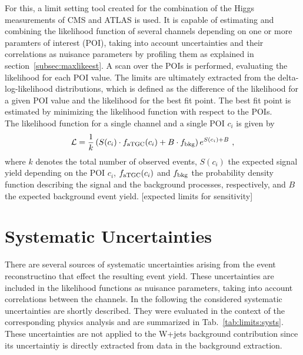 For this, a limit setting tool created for the combination of the Higgs measurements of CMS and ATLAS \cite{combine} is used. It is capable of estimating and combining the likelihood function of several channels depending on one or more paramters of interest (POI), taking into account uncertainties and their correlations as nuisance parameters  by profiling them as explained in section~\ref{subsec:maxlikeest}. A scan over the POIs is performed, evaluating the likelihood for each POI value.
The limits are ultimately extracted from the delta-log-likelihood distributions, which is defined as the difference of the likelihood for a given POI value and the likelihood for the best fit point. The best fit point is estimated by minimizing the likelihood function with respect to the POIs.\\

\noindent The likelihood function for a single channel and a single POI $c_i$ is given by
\begin{equation}
\mathcal{L} = \frac{1}{k} \left( S(c_i)\cdot f_{\rm aTGC}(c_i) + B \cdot f_{\rm bkg} \right) e^{S(c_i) + B} ~,
\end{equation}
where $k$ denotes the total number of observed events, $S(c_i)$ the expected signal yield depending on the POI $c_i$, $f_{\rm aTGC}(c_i)$ and $f_{\rm bkg}$ the probability density function describing the signal and the background processes, respectively, and $B$ the expected background event yield.
[expected limits for sensitivity]

\section{Systematic Uncertainties}
\label{sec:systematics}
There are several sources of systematic uncertainties arising from the event reconstructino that effect the resulting event yield. These uncertainties are included in the likelihood functions as nuisance parameters, taking into account correlations between the channels. In the following the considered systematic uncertainties are shortly described. They were evaluated in the context of the corresponding physics analysis \cite{PAS} and are summarized in Tab.~\ref{tab:limits:systs}. These uncertainties are not applied to the W+jets background contribution since its uncertaintiy is directly extracted from data in the background extraction.
